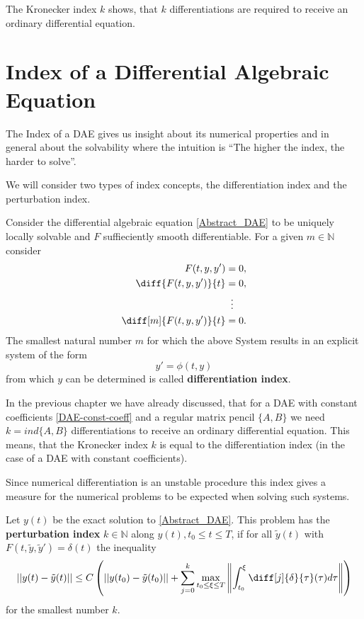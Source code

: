 The Kronecker index $k$ shows, that $k$ differentiations are required to receive an ordinary differential equation.

\section{Index of a Differential Algebraic Equation}

The Index of a DAE gives us insight about its numerical properties and in general about the solvability where the intuition is ``The higher the index, the harder to solve''.

We will consider two types of index concepts, the differentiation index and the perturbation index.

\begin{definition}
	Consider the differential algebraic equation \ref{Abstract_DAE} to be uniquely locally solvable and $F$ suffieciently smooth differentiable. For a given $m \in \mathbb{N}$ consider
	\begin{displaymath}
		\begin{aligned}
			F(t,y,y') &= 0, \\
			\diff{F(t,y,y')}{t} &= 0, \\
			&\vdotswithin{=} \\
			\diff[m]{F(t,y,y')}{t} &= 0.
		\end{aligned}
	\end{displaymath}
	The smallest natural number $m$ for which the above System results in an explicit system of the form
	\begin{displaymath}
		y' = \phi(t,y)
	\end{displaymath}
	from which $y$ can be determined is called \textbf{differentiation index}.
\end{definition}

In the previous chapter we have already discussed, that for a DAE with constant coefficients \eqref{DAE-const-coeff} and a regular matrix pencil $\{A,B\}$  we need $k = ind\{A,B\}$ differentiations to receive an ordinary differential equation. This means, that the Kronecker index $k$ is equal to the differentiation index (in the case of a DAE with constant coefficients).

Since numerical differentiation is an unstable procedure this index gives a measure for the numerical problems to be expected when solving such systems.

\begin{definition}
	Let $y(t)$ be the exact solution to \eqref{Abstract_DAE}. This problem has the \textbf{perturbation index} $k \in \mathbb{N}$ along $y(t), t_0 \leq t \leq T$, if for all  $\tilde{y}(t)$ with $F(t, \tilde{y}, \tilde{y}') = \delta(t)$ the inequality
	\begin{displaymath}
		||y(t)-\tilde{y}(t)|| \leq C \left(||y(t_0)-\tilde{y}(t_0)||+\sum_{j=0}^{k}\max_{t_0 \leq \xi \leq T} \left\rVert 		\int_{t_0}^{\xi}\diff[j]{\delta}{\tau}(\tau)d \tau \right\rVert \right)
	\end{displaymath}
	for the smallest number $k$.
\end{definition}	

